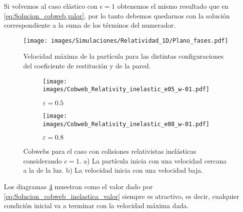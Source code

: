 Si volvemos al caso elástico con \( \epsilon = 1 \) obtenemos el mismo resultado que en \ref{eq:Solucion_cobweb,valor}, por lo tanto debemos quedarnos con la solución correspondiente a la suma de los términos del numerador. 

\begin{figure}[H]
    \centering
    \texttt{[image: images/Simulaciones/Relatividad\_1D/Plano\_fases.pdf]}
    \caption{Velocidad máxima de la partícula para las distintas configuraciones del coeficiente de restitución y de la pared.}
    \label{fig:plano_fases_coef_wall}
\end{figure}

\begin{figure}[H]
    \centering
    \begin{subfigure}[b]{0.49\textwidth}
        \centering
        \texttt{[image: images/Cobweb\_Relativity\_inelastic\_e05\_w-01.pdf]}
        \caption{$\varepsilon = 0.5$}
        \label{fig:Cobweb_inelastics_A}
    \end{subfigure}
    \hfill
    \begin{subfigure}[b]{0.49\textwidth}
        \centering
        \texttt{[image: images/Cobweb\_Relativity\_inelastic\_e08\_w-01.pdf]}
        \caption{$\varepsilon = 0.8$}
        \label{fig:Cobweb_inelastics_B}
    \end{subfigure}
    \caption{Cobwebs para el caso con colisiones relativistas inelásticas considerando $c=1$. a) La partícula inicia con una velocidad cercana a la de la luz. b) La velocidad inicia con una velocidad baja. }
        \label{fig:Cobweb_inelastics}
\end{figure}

Los diagramas \ref{fig:Cobweb_inelastics} muestran como el valor dado por \ref{eq:Solucion_cobweb_inelastica_valor} siempre es atractivo, es decir, cualquier condición inicial va a terminar con la velocidad máxima dada.

%
